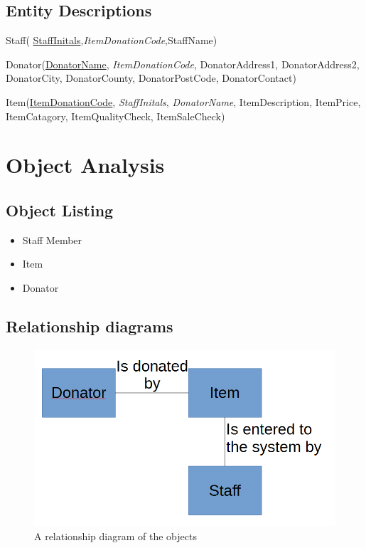 \subsection{Entity Descriptions}
Staff( \underline{StaffInitals},\textit{ItemDonationCode},StaffName)

Donator(\underline{DonatorName}, \textit{ItemDonationCode}, DonatorAddress1, DonatorAddress2, DonatorCity, DonatorCounty, DonatorPostCode, DonatorContact)

Item(\underline{ItemDonationCode}, \textit{StaffInitals}, \textit{DonatorName}, ItemDescription, ItemPrice, ItemCatagory, ItemQualityCheck, ItemSaleCheck)

\section{Object Analysis}

\subsection{Object Listing}
\begin{itemize}
    \item Staff Member
    \item Item
    \item Donator
\end{itemize}

\subsection{Relationship diagrams}
\begin{figure}[H]
    \includegraphics[width=\textwidth]{./Analysis/RelationshipDiagram.png}
    \caption{A relationship diagram of the objects} \label{fig:Relationship Diagram}
\end{figure}
